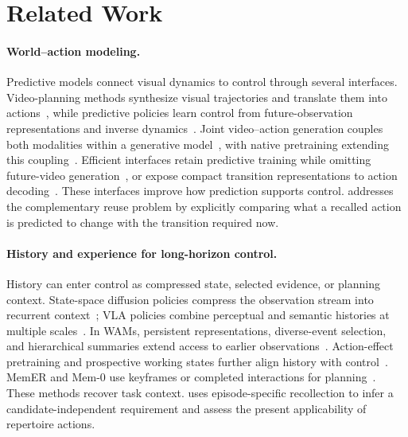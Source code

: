 \section{Related Work}
\label{sec:related}

\paragraph{World--action modeling.}
Predictive models connect visual dynamics to control through several interfaces.
Video-planning methods synthesize visual trajectories and translate them into actions~\citep{du2023unipi}, while predictive policies learn control from future-observation representations and inverse dynamics~\citep{tian2025seer,hu2025vpp}.
Joint video--action generation couples both modalities within a generative model~\citep{zhu2025uwm,bi2025motus,kim2026cosmospolicy,ye2026dreamzero}, with native pretraining extending this coupling~\citep{zhang2026lingbotva2}.
Efficient interfaces retain predictive training while omitting future-video generation~\citep{yuan2026fastwam}, or expose compact transition representations to action decoding~\citep{ma2026pilot}.
These interfaces improve how prediction supports control. \method{} addresses the complementary reuse problem by explicitly comparing what a recalled action is predicted to change with the transition required now.

\paragraph{History and experience for long-horizon control.}
History can enter control as compressed state, selected evidence, or planning context.
State-space diffusion policies compress the observation stream into recurrent context~\citep{guan2026dssp}; VLA policies combine perceptual and semantic histories at multiple scales~\citep{shi2025memoryvla,torne2026mem}.
In WAMs, persistent representations, diverse-event selection, and hierarchical summaries extend access to earlier observations~\citep{yang2026memorywam,wang2026dimwam,sun2026himem}.
Action-effect pretraining and prospective working states further align history with control~\citep{zhou2026actioneffect,guo2026chameleon}.
MemER and Mem-0 use keyframes or completed interactions for planning~\citep{sridhar2025memer,chen2026rmbench}.
These methods recover task context. \method{} uses episode-specific recollection to infer a candidate-independent requirement and assess the present applicability of repertoire actions.

